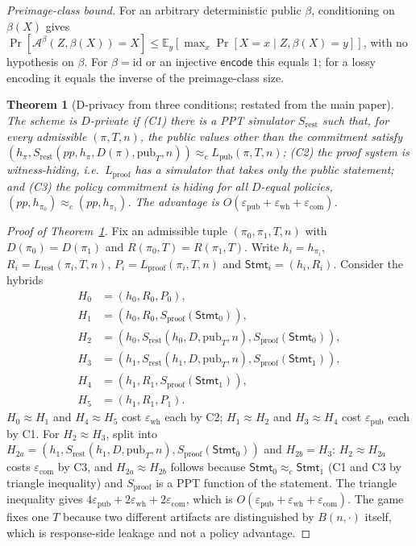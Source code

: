 \documentclass[10pt,journal,compsoc]{IEEEtran}
\newtheorem{theorem}{Theorem}
\begin{document}
\noindent\emph{Preimage-class bound.} For an arbitrary deterministic public
$\beta$, conditioning on $\beta(X)$ gives
$\Pr[\mathcal{A}^\beta(Z,\beta(X))=X]\le
\mathbb{E}_y[\max_x\Pr[X=x\mid Z,\beta(X)=y]]$, with no hypothesis on $\beta$.
For $\beta=\mathrm{id}$ or an injective $\mathsf{encode}$ this equals $1$; for a
lossy encoding it equals the inverse of the preimage-class size.

\begin{theorem}[D-privacy from three conditions; restated from the main paper]
\label{thm:dpriv}
The scheme is $D$-private if (C1) there is a PPT simulator $S_{\mathrm{rest}}$
such that, for every admissible $(\pi,T,n)$, the public values other than the
commitment satisfy
$(h_\pi,S_{\mathrm{rest}}(pp,h_\pi,D(\pi),\mathrm{pub}_T,n))\approx_c
L_{\mathrm{pub}}(\pi,T,n)$; (C2) the proof system is witness-hiding, i.e.\
$L_{\mathrm{proof}}$ has a simulator that takes only the public statement;
and (C3) the policy commitment is hiding for all $D$-equal policies,
$(pp,h_{\pi_0})\approx_c(pp,h_{\pi_1})$. The advantage is
$O(\varepsilon_{\mathrm{pub}}+\varepsilon_{\mathrm{wh}}+\varepsilon_{\mathrm{com}})$.
\end{theorem}

\begin{proof}[Proof of Theorem~\ref{thm:dpriv}]
Fix an admissible tuple $(\pi_0,\pi_1,T,n)$ with $D(\pi_0)=D(\pi_1)$ and
$R(\pi_0,T)=R(\pi_1,T)$. Write $h_i=h_{\pi_i}$,
$R_i=L_{\mathrm{rest}}(\pi_i,T,n)$, $P_i=L_{\mathrm{proof}}(\pi_i,T,n)$ and
$\mathsf{Stmt}_i=(h_i,R_i)$. Consider the hybrids
\begin{align*}
H_0&=(h_0,R_0,P_0),\\
H_1&=(h_0,R_0,S_{\mathrm{proof}}(\mathsf{Stmt}_0)),\\
H_2&=(h_0,S_{\mathrm{rest}}(h_0,D,\mathrm{pub}_T,n),S_{\mathrm{proof}}(\mathsf{Stmt}_0)),\\
H_3&=(h_1,S_{\mathrm{rest}}(h_1,D,\mathrm{pub}_T,n),S_{\mathrm{proof}}(\mathsf{Stmt}_1)),\\
H_4&=(h_1,R_1,S_{\mathrm{proof}}(\mathsf{Stmt}_1)),\\
H_5&=(h_1,R_1,P_1).
\end{align*}
$H_0\approx H_1$ and $H_4\approx H_5$ cost $\varepsilon_{\mathrm{wh}}$ each by
C2; $H_1\approx H_2$ and $H_3\approx H_4$ cost
$\varepsilon_{\mathrm{pub}}$ each by C1. For $H_2\approx H_3$, split into
$H_{2a}=(h_1,S_{\mathrm{rest}}(h_1,D,\mathrm{pub}_T,n),S_{\mathrm{proof}}(\mathsf{Stmt}_0))$
and $H_{2b}=H_3$: $H_2\approx H_{2a}$ costs $\varepsilon_{\mathrm{com}}$ by C3,
and $H_{2a}\approx H_{2b}$ follows because
$\mathsf{Stmt}_0\approx_c\mathsf{Stmt}_1$ (C1 and C3 by triangle inequality) and
$S_{\mathrm{proof}}$ is a PPT function of the statement. The triangle inequality
gives $4\varepsilon_{\mathrm{pub}}+2\varepsilon_{\mathrm{wh}}+2\varepsilon_{\mathrm{com}}$,
which is $O(\varepsilon_{\mathrm{pub}}+\varepsilon_{\mathrm{wh}}+\varepsilon_{\mathrm{com}})$.
The game fixes one $T$ because two different artifacts are distinguished by
$B(n,\cdot)$ itself, which is response-side leakage and not a policy advantage.
\end{proof}
\end{document}
